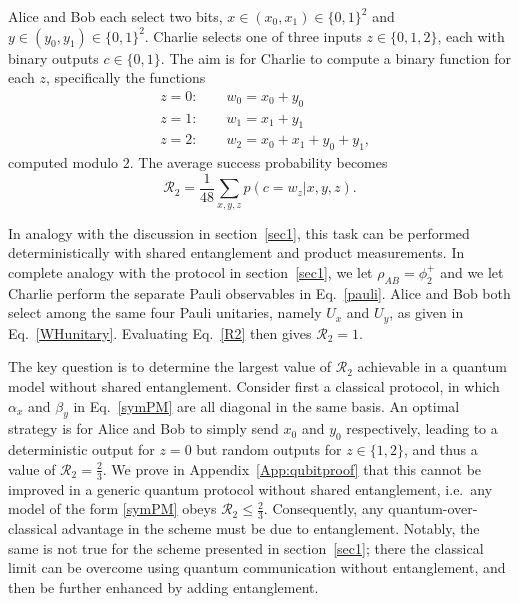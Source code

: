 \documentclass[aps,superscriptaddress,twocolumn,twoside,floatfix,pra,nofootinbib,a4paper]{revtex4-2}
\newcommand{\moha}[1]{\textit{\small\textcolor{cyan}{moha: #1}}}
\begin{document}
Alice and Bob each select two bits, $x\in(x_0,x_1)\in\{0,1\}^2$ and $y\in(y_0,y_1)\in\{0,1\}^2$. Charlie selects one of three inputs $z\in\{0,1,2\}$, each with binary outputs $c\in\{0,1\}$. The aim is for Charlie to compute a binary function for each $z$, specifically the functions 
\begin{align}\nonumber
&z=0: \qquad w_0=x_0+ y_0 \\\nonumber
&z=1: \qquad w_1=x_1+ y_1 \\\label{wincond2}
&z=2: \qquad w_2=x_0+ x_1+ y_0+ y_1,
\end{align}
computed modulo $2$. The average success probability becomes
\begin{equation}\label{R2}
\mathcal{R}_2=\frac{1}{48}\sum_{x,y,z}p(c=w_z|x,y,z).
\end{equation}

In analogy with the discussion in section~\ref{sec1}, this task can be performed deterministically with shared entanglement and product measurements. In complete analogy with the protocol in section~\ref{sec1}, we let $\rho_{AB}=\phi^+_2$ and we let Charlie perform the separate Pauli observables in Eq.~\eqref{pauli}. Alice and Bob both select among the same four Pauli unitaries, namely $U_x$ and $U_y$, as given in Eq.~\eqref{WHunitary}. Evaluating Eq.~\eqref{R2} then gives $\mathcal{R}_2=1$. 


The key question is to determine the largest value of $\mathcal{R}_2$ achievable in a quantum model without shared entanglement.  Consider first a classical protocol, in which $\alpha_x$ and $\beta_y$ in Eq.~\eqref{symPM} are all diagonal in the same basis. An optimal strategy is for Alice and Bob to simply send $x_0$ and $y_0$ respectively, leading to a deterministic output for $z=0$ but random outputs for $z\in\{1,2\}$, and thus a value of $\mathcal{R}_2=\frac{2}{3}$. 
We prove in Appendix~\ref{App:qubitproof} that this cannot be improved in a generic quantum protocol without shared entanglement, i.e.~any model of the form \eqref{symPM} obeys $\mathcal{R}_2\leq \frac{2}{3}$. Consequently, any quantum-over-classical advantage in the scheme must be due to entanglement. Notably, the same is not true for the scheme presented in section~\ref{sec1}; there the classical limit can be overcome using quantum communication without entanglement, and then be further enhanced by adding entanglement. %
\end{document}
